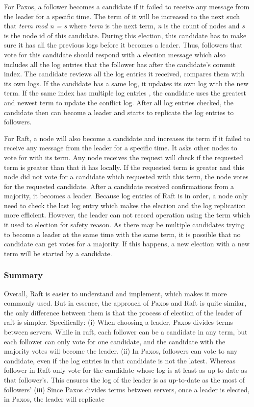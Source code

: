 \documentclass[12pt, a4paper]{article}
\begin{document}
For Paxos, a follower becomes a candidate if it failed to receive any message from the leader for a specific time. The term of it will be increased to the next such that \textit{term mod n = s} where \textit{term} is the next term, \textit{n} is the count of nodes and \textit{s} is the node id of this candidate. During this election, this candidate has to make sure it has all the previous logs before it becomes a leader. Thus, followers that vote for this candidate should respond with a election message which also includes all the log entries that the follower has after the candidate’s commit index. The candidate reviews all the log entries it received, compares them with its own logs. If the candidate has a same log, it updates its own log with the new term. If the same index has multiple log entries , the candidate uses the greatest and newest term to update the conflict log. After all log entries checked, the candidate then can become a leader and starts to replicate the log entries to followers.

For Raft, a node will also become a candidate and increases its term if it failed to receive any message from the leader for a specific time. It asks other nodes to vote for with its term. Any node receives the request will check if the requested term is greater than that it has locally. If the requested term is greater and this node did not vote for a candidate which requested with this term, the node votes for the requested candidate. After a candidate received confirmations from a majority, it becomes a leader. Because log entries of Raft is in order, a node only need to check the last log entry which makes the election and the log replication more efficient.
However, the leader can not record operation using the term which it used to election for safety reason. As there may be multiple candidates trying to become a leader at the same time with the same term, it is possible that no candidate can get votes for a majority. If this happens, a new election with a new term will be started by a candidate.

\subsubsection{Summary}
Overall, Raft is easier to understand and implement, which makes it more commonly used. But in essence, the approach of Paxos and Raft is quite similar, the only difference between them is that the process of election of the leader of raft is simpler. Specifically: (i) When choosing a leader, Paxos divides terms between servers. While in raft, each follower can be a candidate in any term, but each follower can only vote for one candidate, and the candidate with the majority votes will become the leader. (ii) In Paxos, followers can vote to any candidate, even if the log entries in that candidate is not the latest. Whereas follower in Raft only vote for the candidate whose log is at least as up-to-date as that follower's. This ensures the log of the leader is as up-to-date as the most of followers' (iii) Since Paxos divides terms between servers, once a leader is elected, in Paxos, the leader will replicate
\end{document}
